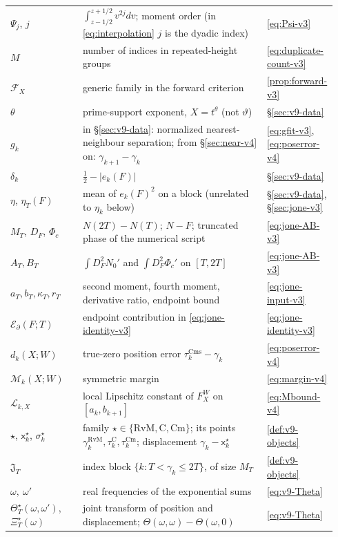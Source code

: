 \documentclass[11pt,a4paper]{article}
\numberwithin{equation}{section}
\theoremstyle{definition}
\theoremstyle{remark}
\newcommand{\Cm}{\mathrm{Cm}}
\newcommand{\Cms}{\mathrm{Cms}}
\begin{document}
\begin{longtable}{@{}p{0.22\linewidth}p{0.56\linewidth}p{0.16\linewidth}@{}}
$\Psi_j$, $j$ & $\int_{z-1/2}^{z+1/2}v^{2j}dv$; moment order (in \eqref{eq:interpolation} $j$ is the dyadic index) & \eqref{eq:Psi-v3}\\
$M$ & number of indices in repeated-height groups & \eqref{eq:duplicate-count-v3}\\
$\mathscr F_X$ & generic family in the forward criterion & \cref{prop:forward-v3}\\
$\theta$ & prime-support exponent, $X=t^\theta$ (not $\vartheta$) & \S\ref{sec:v9-data}\\
$g_k$ & in \S\ref{sec:v9-data}: normalized nearest-neighbour separation; from \S\ref{sec:near-v4} on: $\gamma_{k+1}-\gamma_k$ & \eqref{eq:gfit-v3}, \eqref{eq:poserror-v4}\\
$\delta_k$ & $\frac12-|e_k(F)|$ & \S\ref{sec:v9-data}\\
$\eta$, $\eta_T(F)$ & mean of $e_k(F)^2$ on a block (unrelated to $\eta_k$ below) & \S\ref{sec:v9-data}, \S\ref{sec:jone-v3}\\
$M_T$, $D_F$, $\Phi_c$ & $N(2T)-N(T)$; $N-F$; truncated phase of the numerical script & \eqref{eq:jone-AB-v3}\\
$A_T,B_T$ & $\int D_F^2N_0'$ and $\int D_F^2\Phi_c'$ on $[T,2T]$ & \eqref{eq:jone-AB-v3}\\
$a_T,b_T,\kappa_T,r_T$ & second moment, fourth moment, derivative ratio, endpoint bound & \eqref{eq:jone-input-v3}\\
$\mathcal E_\partial(F;T)$ & endpoint contribution in \eqref{eq:jone-identity-v3} & \eqref{eq:jone-identity-v3}\\
$d_k(X;W)$ & true-zero position error $\tau_k^{\Cms}-\gamma_k$ & \eqref{eq:poserror-v4}\\
$\mathcal M_k(X;W)$ & symmetric margin & \eqref{eq:margin-v4}\\
$\mathscr L_{k,X}$ & local Lipschitz constant of $F_X^W$ on $[a_k,b_{k+1}]$ & \eqref{eq:Mbound-v4}\\
$\star$, $\mathsf x_k^\star$, $\sigma_k^\star$ & family $\star\in\{\mathrm{RvM},\mathrm C,\Cm\}$; its points $\gamma_k^{\mathrm{RvM}},\tau_k^{\mathrm C},\tau_k^{\Cm}$; displacement $\gamma_k-\mathsf x_k^\star$ & \cref{def:v9-objects}\\
$\mathfrak J_T$ & index block $\{k:T<\gamma_k\le2T\}$, of size $M_T$ & \cref{def:v9-objects}\\
$\omega,\ \omega'$ & real frequencies of the exponential sums & \eqref{eq:v9-Theta}\\
$\Theta_T^\star(\omega,\omega')$, $\Xi_T^\star(\omega)$ & joint transform of position and displacement; $\Theta(\omega,\omega)-\Theta(\omega,0)$ & \eqref{eq:v9-Theta}\\

\end{longtable}
\end{document}
